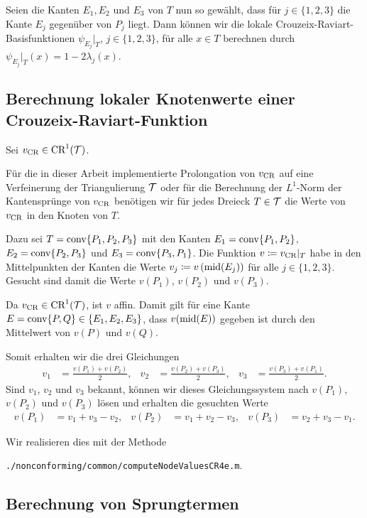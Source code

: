 Seien die Kanten $E_1,E_2$ und $E_3$ von $T$ nun so gewählt, dass für
$j\in\{1,2,3\}$ die Kante $E_j$ gegenüber von $P_j$ liegt. 
Dann können wir die lokale Crouzeix-Raviart-Basisfunktionen 
$\psi_{E_j}\!|_T$, $j\in\{1,2,3\}$, für alle $x\in T$ berechnen durch
$\psi_{E_j}\!|_T(x)=1-2\lambda_j(x)$.


\subsection{Berechnung lokaler Knotenwerte einer Crouzeix-Raviart-Funktion}

Sei $v_\textup{CR}\in\textup{CR}^1(\mathcal{T})$.

Für die in dieser Arbeit implementierte Prolongation von $v_\textup{CR}$ auf eine
Verfeinerung der Triangulierung $\mathcal{T}$ oder für die Berechnung der $L^1$-Norm
der Kantensprünge von $v_\textup{CR}$ benötigen wir für jedes Dreieck $T\in\mathcal{T}$ die
Werte von $v_\textup{CR}$ in den Knoten von $T$. 

Dazu sei $T = \textup{conv}\{P_1, P_2, P_3\}$ mit den Kanten
$E_1 = \textup{conv}\{P_1,P_2\}$, $E_2 = \textup{conv}\{P_2,P_3\}$ und $E_3 =
\textup{conv}\{P_3,P_1\}$. 
Die Funktion $v\coloneqq v_\textup{CR}|_T$ habe in den Mittelpunkten der Kanten die Werte
$v_j\coloneqq v\left(\textup{mid}(E_j)\right)$ für alle $j\in\{1,2,3\}$. 
Gesucht sind damit die Werte $v(P_1)$, $v(P_2)$ und $v(P_3)$.

Da $v_\textup{CR}\in\textup{CR}^1(\mathcal{T})$, ist $v$ affin. Damit gilt für eine Kante
$E=\textup{conv}\{P,Q\}\in\{E_1,E_2,E_3\}$, dass $v(\textup{mid}(E))$ gegeben ist durch den
Mittelwert von $v(P)$ und $v(Q)$.

Somit erhalten wir die drei Gleichungen
\begin{align*}
  v_1 &= \frac{v(P_1)+v(P_2)}{2},  
  &v_2 &= \frac{v(P_2)+v(P_3)}{2},  
  &v_3 &= \frac{v(P_3)+v(P_1)}{2}.
\end{align*}
Sind $v_1$, $v_2$ und $v_3$ bekannt, können wir dieses Gleichungssystem nach 
$v(P_1)$, $v(P_2)$ und $v(P_3)$ lösen und erhalten die gesuchten Werte
\begin{align*}
 v(P_1)&=v_1+v_3-v_2, &v(P_2)&= v_1+v_2-v_3,&v(P_3)&=v_2+v_3-v_1.
\end{align*}

Wir realisieren dies mit der Methode
\begin{center}
  \texttt{./nonconforming/common/computeNodeValuesCR4e.m}.
\end{center} 

\subsection{Berechnung von Sprungtermen}

